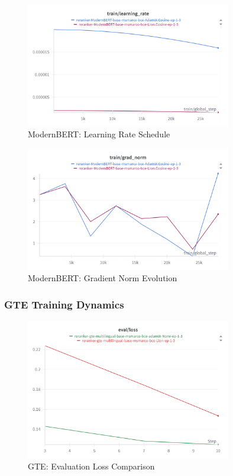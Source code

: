 \begin{figure}[htbp]
    \centering
    \includegraphics[width=0.8\textwidth]{Figures/modernBERT-Lion-adamW-lrate.png}
    \caption{ModernBERT: Learning Rate Schedule}
    \label{fig:modernbert_lr}
\end{figure}

\begin{figure}[htbp]
    \centering
    \includegraphics[width=0.8\textwidth]{Figures/modernBERT-Lion-adamW_grad_norm.png}
    \caption{ModernBERT: Gradient Norm Evolution}
    \label{fig:modernbert_grad_norm}
\end{figure}

\subsubsection{GTE Training Dynamics}

\begin{figure}[htbp]
    \centering
    \includegraphics[width=0.8\textwidth]{Figures/gte_adamW_v_lion_eval_loss.png}
    \caption{GTE: Evaluation Loss Comparison}
    \label{fig:gte_eval_loss}
\end{figure}

